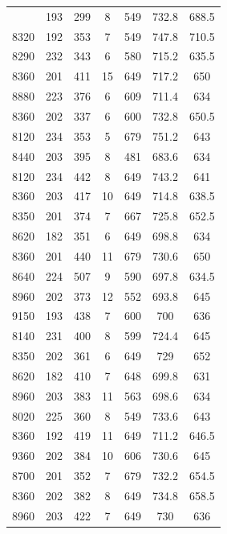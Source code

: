 \begin{longtable}{ccccccc}
			\bottomrule
			\endlastfoot
      8450  & 193   & 299   & 8     & 549   & 732.8 & 688.5 \\
      8320  & 192   & 353   & 7     & 549   & 747.8 & 710.5 \\
      8290  & 232   & 343   & 6     & 580   & 715.2 & 635.5 \\
      8360  & 201   & 411   & 15    & 649   & 717.2 & 650 \\
      8880  & 223   & 376   & 6     & 609   & 711.4 & 634 \\
      8360  & 202   & 337   & 6     & 600   & 732.8 & 650.5 \\
      8120  & 234   & 353   & 5     & 679   & 751.2 & 643 \\
      8440  & 203   & 395   & 8     & 481   & 683.6 & 634 \\
      8120  & 234   & 442   & 8     & 649   & 743.2 & 641 \\
      8360  & 203   & 417   & 10    & 649   & 714.8 & 638.5 \\
      8350  & 201   & 374   & 7     & 667   & 725.8 & 652.5 \\
      8620  & 182   & 351   & 6     & 649   & 698.8 & 634 \\
      8360  & 201   & 440   & 11    & 679   & 730.6 & 650 \\
      8640  & 224   & 507   & 9     & 590   & 697.8 & 634.5 \\
      8960  & 202   & 373   & 12    & 552   & 693.8 & 645 \\
      9150  & 193   & 438   & 7     & 600   & 700   & 636 \\
      8140  & 231   & 400   & 8     & 599   & 724.4 & 645 \\
      8350  & 202   & 361   & 6     & 649   & 729   & 652 \\
      8620  & 182   & 410   & 7     & 648   & 699.8 & 631 \\
      8960  & 203   & 383   & 11    & 563   & 698.6 & 634 \\
      8020  & 225   & 360   & 8     & 549   & 733.6 & 643 \\
      8360  & 192   & 419   & 11    & 649   & 711.2 & 646.5 \\
      9360  & 202   & 384   & 10    & 606   & 730.6 & 645 \\
      8700  & 201   & 352   & 7     & 679   & 732.2 & 654.5 \\
      8360  & 202   & 382   & 8     & 649   & 734.8 & 658.5 \\
      8960  & 203   & 422   & 7     & 649   & 730   & 636 \\

\end{longtable}
